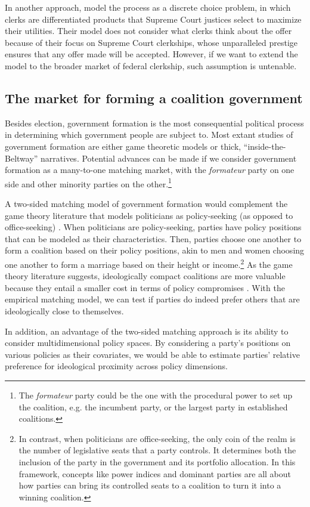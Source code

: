 In another approach, \citet{Rozema2016} model the process as a discrete choice
problem, in which clerks are differentiated products that Supreme Court justices
select to maximize their utilities. Their model does not consider what clerks
think about the offer because of their focus on Supreme Court clerkships, whose
unparalleled prestige ensures that any offer made will be accepted. However, if
we want to extend the model to the broader market of federal clerkship, such
assumption is untenable.

\subsection{The market for forming a coalition government}

Besides election, government formation is the most consequential political
process in determining which government people are subject to. Most extant
studies of government formation are either game theoretic models or thick,
``inside-the-Beltway'' narratives. Potential advances can be made if we consider
government formation as a many-to-one matching market, with the
\textit{formateur} party on one side and other minority parties on the
other.\footnote{The \textit{formateur} party could be the one with the
  procedural power to set up the coalition, e.g. the incumbent party, or the
  largest party in established coalitions.}

A two-sided matching model of government formation would complement the game
theory literature that models politicians as policy-seeking (as opposed to
office-seeking) \citep{Laver1998}. When politicians are policy-seeking, parties
have policy positions that can be modeled as their characteristics. Then,
parties choose one another to form a coalition based on their policy positions,
akin to men and women choosing one another to form a marriage based on their
height or income.\footnote{In contrast, when politicians are office-seeking, the
  only coin of the realm is the number of legislative seats that a party
  controls. It determines both the inclusion of the party in the government and
  its portfolio allocation. In this framework, concepts like power indices and
  dominant parties are all about how parties can bring its controlled seats to a
  coalition to turn it into a winning coalition.} As the game theory literature
suggests, ideologically compact coalitions are more valuable because they entail
a smaller cost in terms of policy compromises \citep{DeSwaan1973}. With the empirical
matching model, we can test if parties do indeed prefer others that are
ideologically close to themselves.

In addition, an advantage of the two-sided matching approach is its ability to
consider multidimensional policy spaces. By considering a party's positions on
various policies as their covariates, we would be able to estimate parties'
relative preference for ideological proximity across policy dimensions.

